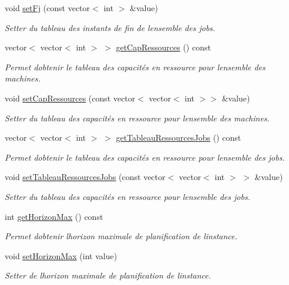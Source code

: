 \begin{DoxyCompactItemize}
void \hyperlink{classInstance_a3d954198f1caa44f89a61262c14fc716}{set\+Fj} (const vector$<$ int $>$ \&value)
\begin{DoxyCompactList}\small\item\em Setter du tableau des instants de fin de l\textquotesingle{}ensemble des jobs. \end{DoxyCompactList}\item 
vector$<$ vector$<$ int $>$ $>$ \hyperlink{classInstance_a98fcba260003717a635cec8fee3c3a27}{get\+Cap\+Ressources} () const
\begin{DoxyCompactList}\small\item\em Permet d\textquotesingle{}obtenir le tableau des capacités en ressource pour l\textquotesingle{}ensemble des machines. \end{DoxyCompactList}\item 
void \hyperlink{classInstance_a57f113b9723182ba7f8f5346b34095eb}{set\+Cap\+Ressources} (const vector$<$ vector$<$ int $>$$>$ \&value)
\begin{DoxyCompactList}\small\item\em Setter du tableau des capacités en ressource pour l\textquotesingle{}ensemble des machines. \end{DoxyCompactList}\item 
vector$<$ vector$<$ int $>$ $>$ \hyperlink{classInstance_a98460018fa91a213ce7c1fe83a318641}{get\+Tableau\+Ressources\+Jobs} () const
\begin{DoxyCompactList}\small\item\em Permet d\textquotesingle{}obtenir le tableau des capacités en ressource pour l\textquotesingle{}ensemble des jobs. \end{DoxyCompactList}\item 
void \hyperlink{classInstance_a4d3bf921882ce7809cc718200e9cf6e9}{set\+Tableau\+Ressources\+Jobs} (const vector$<$ vector$<$ int $>$ $>$ \&value)
\begin{DoxyCompactList}\small\item\em Setter du tableau des capacités en ressource pour l\textquotesingle{}ensemble des jobs. \end{DoxyCompactList}\item 
int \hyperlink{classInstance_aeb425f8526606ab97dea1fbbe5973381}{get\+Horizon\+Max} () const
\begin{DoxyCompactList}\small\item\em Permet d\textquotesingle{}obtenir l\textquotesingle{}horizon maximale de planification de l\textquotesingle{}instance. \end{DoxyCompactList}\item 
void \hyperlink{classInstance_a048579344184b12873bf1d6bceb7ac9e}{set\+Horizon\+Max} (int value)
\begin{DoxyCompactList}\small\item\em Setter de l\textquotesingle{}horizon maximale de planification de l\textquotesingle{}instance. \end{DoxyCompactList}\end{DoxyCompactItemize}


